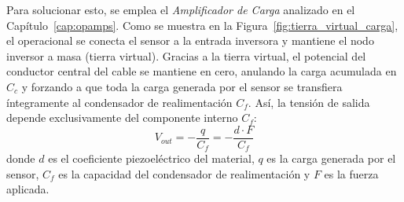 \begin{marginfigure}
    \centering
    \shorthandoff{>}
    \caption[Efecto de la tierra virtual en el cable.]{Configuración de amplificador de carga. Al mantener el nodo inversor a potencial de masa (tierra virtual), la capacidad del cable $C_c$ no almacena carga ($q=C \cdot 0 = 0$), eliminando su influencia en la medida.}\label{fig:tierra_virtual_carga}
\end{marginfigure}

Para solucionar esto, se emplea el \emph{Amplificador de Carga} analizado en el Capítulo~\ref{cap:opamps}. Como se muestra en la Figura~\ref{fig:tierra_virtual_carga}, el operacional se conecta el sensor a la entrada inversora y mantiene el nodo inversor a masa (tierra virtual). Gracias a la tierra virtual, el potencial del conductor central del cable se mantiene en cero, anulando la carga acumulada en $C_c$ y forzando a que toda la carga generada por el sensor se transfiera íntegramente al condensador de realimentación $C_f$. Así, la tensión de salida depende exclusivamente del componente interno $C_f$:
\begin{equation}
    V_{out} = -\frac{q}{C_f} = -\frac{d \cdot F}{C_f}
\end{equation}
donde $d$ es el coeficiente piezoeléctrico del material, $q$ es la carga generada por el sensor, $C_f$ es la capacidad del condensador de realimentación y $F$ es la fuerza aplicada.

